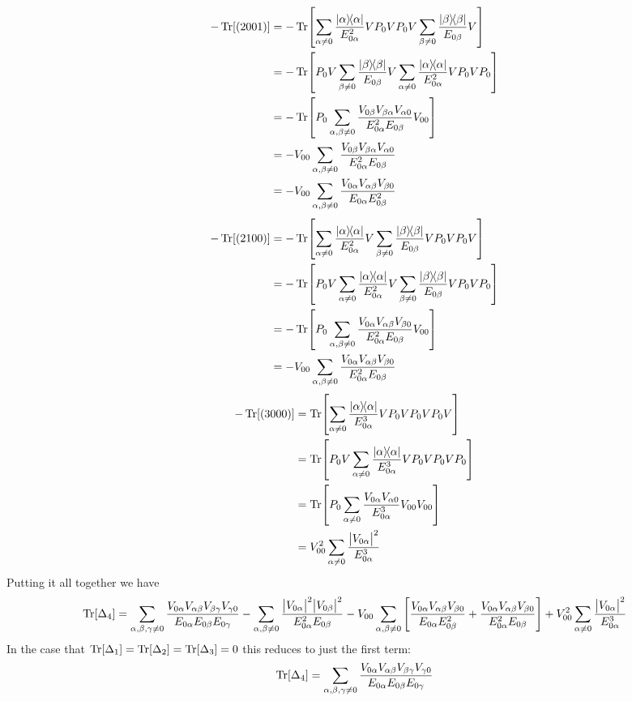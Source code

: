\documentclass[12pt]{article}
\newcommand{\magsq}[1]{\big|#1\big|^2}
\begin{document}
\begin{align*}
    -\Tr[(2001)] &= -\Tr[\sum_{\alpha\neq 0}\frac{\dyad{\alpha}}{E_{0\alpha}^2}VP_0VP_0V\sum_{\beta\neq 0}\frac{\dyad{\beta}}{E_{0\beta}}V] \\
    &= -\Tr[P_0V\sum_{\beta\neq 0}\frac{\dyad{\beta}}{E_{0\beta}}V\sum_{\alpha\neq 0}\frac{\dyad{\alpha}}{E_{0\alpha}^2}VP_0VP_0] \\
    &= -\Tr[P_0\sum_{\alpha,\beta\neq 0}\frac{V_{0\beta}V_{\beta\alpha}V_{\alpha 0}}{E_{0\alpha}^2E_{0\beta}}V_{00}] \\
    &= -V_{00}\sum_{\alpha,\beta\neq 0}\frac{V_{0\beta}V_{\beta\alpha}V_{\alpha 0}}{E_{0\alpha}^2E_{0\beta}} \\
    &= -V_{00}\sum_{\alpha,\beta\neq 0}\frac{V_{0\alpha}V_{\alpha\beta}V_{\beta 0}}{E_{0\alpha}E_{0\beta}^2}
\end{align*}
\begin{align*}
    -\Tr[(2100)] &= -\Tr[\sum_{\alpha\neq 0}\frac{\dyad{\alpha}}{E_{0\alpha}^2}V\sum_{\beta\neq 0}\frac{\dyad{\beta}}{E_{0\beta}}VP_0VP_0V] \\
    &= -\Tr[P_0V\sum_{\alpha\neq 0}\frac{\dyad{\alpha}}{E_{0\alpha}^2}V\sum_{\beta\neq 0}\frac{\dyad{\beta}}{E_{0\beta}}VP_0VP_0] \\
    &= -\Tr[P_0\sum_{\alpha,\beta\neq 0}\frac{V_{0\alpha}V_{\alpha\beta}V_{\beta 0}}{E_{0\alpha}^2E_{0\beta}}V_{00}] \\
    &= -V_{00}\sum_{\alpha,\beta\neq 0}\frac{V_{0\alpha}V_{\alpha\beta}V_{\beta 0}}{E_{0\alpha}^2E_{0\beta}}
\end{align*}
\begin{align*}
    -\Tr[(3000)] &= \Tr[\sum_{\alpha\neq 0}\frac{\dyad{\alpha}}{E_{0\alpha}^3}VP_0VP_0VP_0V] \\
    &= \Tr[P_0V\sum_{\alpha\neq 0}\frac{\dyad{\alpha}}{E_{0\alpha}^3}VP_0VP_0VP_0] \\
    &= \Tr[P_0\sum_{\alpha\neq 0}\frac{V_{0\alpha}V_{\alpha 0}}{E_{0\alpha}^3}V_{00}V_{00}] \\
    &= V_{00}^2\sum_{\alpha\neq 0}\frac{\magsq{V_{0\alpha}}}{E_{0\alpha}^3}
\end{align*}
Putting it all together we have
\[ \Tr[\Delta_4] = \sum_{\alpha,\beta,\gamma\neq 0}\frac{V_{0\alpha}V_{\alpha\beta}V_{\beta\gamma}V_{\gamma 0}}{E_{0\alpha}E_{0\beta}E_{0\gamma}} -\sum_{\alpha,\beta\neq 0} \frac{\magsq{V_{0\alpha}}\magsq{V_{0\beta}}}{E_{0\alpha}^2E_{0\beta}} -V_{00}\sum_{\alpha,\beta\neq 0}\left[\frac{V_{0\alpha}V_{\alpha\beta}V_{\beta 0}}{E_{0\alpha}E_{0\beta}^2}+\frac{V_{0\alpha}V_{\alpha\beta}V_{\beta 0}}{E_{0\alpha}^2E_{0\beta}}\right] + V_{00}^2\sum_{\alpha\neq 0}\frac{\magsq{V_{0\alpha}}}{E_{0\alpha}^3} \]
In the case that $\Tr[\Delta_1] = \Tr[\Delta_2] = \Tr[\Delta_3] = 0$ this reduces to just the first term:
\[ \Tr[\Delta_4] = \sum_{\alpha,\beta,\gamma\neq 0}\frac{V_{0\alpha}V_{\alpha\beta}V_{\beta\gamma}V_{\gamma 0}}{E_{0\alpha}E_{0\beta}E_{0\gamma}} \]
\end{document}
